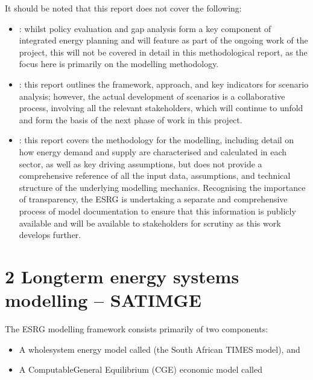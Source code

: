 \documentclass[letterpaper,10pt,english]{jupyterBook}
\begin{document}
\sphinxAtStartPar
It should be noted that this report does not cover the following:
\begin{itemize}
\item {} 
\sphinxAtStartPar
{}: whilst policy evaluation and gap analysis form a key component of integrated energy planning and will feature as part of the ongoing work of the project, this will not be covered in detail in this methodological report, as the focus here is primarily on the modelling methodology.

\item {} 
\sphinxAtStartPar
{}: this report outlines the framework, approach, and key indicators for scenario analysis; however, the actual development of scenarios is a collaborative process, involving all the relevant stakeholders, which will continue to unfold and form the basis of the next phase of work in this project. 

\item {} 
\sphinxAtStartPar
{}: this report covers the methodology for the modelling, including detail on how energy demand and supply are characterised and calculated in each sector, as well as key driving assumptions, but does not provide a comprehensive reference of all the input data, assumptions, and technical structure of the underlying modelling mechanics. Recognising the importance of transparency, the ESRG is undertaking a separate and comprehensive process of model documentation to ensure that this information is publicly available and will be available to stakeholders for scrutiny as this work develops further.

\end{itemize}

\sphinxstepscope


\chapter{2 Long\sphinxhyphen{}term energy systems modelling – SATIMGE}
\label{\detokenize{02SATIMGE:long-term-energy-systems-modelling-satimge}}\label{\detokenize{02SATIMGE::doc}}
\sphinxAtStartPar
The ESRG modelling framework consists primarily of two components:
\begin{itemize}
\item {} 
\sphinxAtStartPar
A whole\sphinxhyphen{}system energy model called  (the South African TIMES model), and

\item {} 
\sphinxAtStartPar
A Computable\sphinxhyphen{}General Equilibrium (CGE) economic model called 

\end{itemize}
\end{document}
